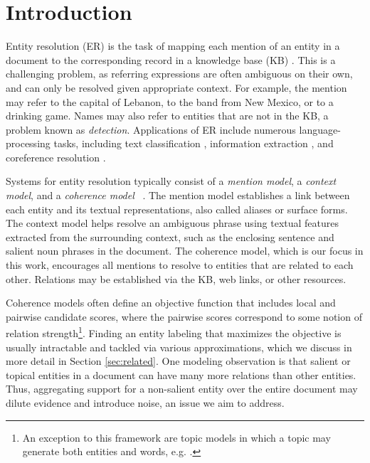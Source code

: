 \section{Introduction}
\label{sec:intro}

Entity resolution (ER) is the task of mapping each mention of an entity in a document to the corresponding record in a knowledge base (KB) \cite{BunescuP06,Cucerzan07,KulkarniSRC09,Dredze2010,Hoffart2011,Hachey2013130}.  
This is a challenging problem, as referring expressions are often ambiguous on their own, and can only be resolved given appropriate context. For example, the mention  may refer to the capital of Lebanon, to the band from New Mexico, or to a drinking game. Names may also refer to entities that are not in the KB, a problem known as \emph{{\NIL} detection}. 
Applications of ER include numerous language-processing tasks, including text classification \cite{Gabrilovich2007}, information extraction \cite{Lin2012}, and coreference resolution \cite{finin2009Coreference,mayfield2009cross}. 

Systems for entity resolution typically consist of a \emph{mention model}, a \emph{context model}, and a \emph{coherence model}~\cite{Milne2008,Cucerzan07,Ratinov11,Hoffart2011,Hachey2013130} .  The mention model establishes a link between each entity and its textual representations, also called aliases or surface forms. The context model helps resolve an ambiguous phrase using textual features extracted from the surrounding context, such as the enclosing sentence and salient noun phrases in the document. The coherence model, which is our focus in this work, encourages all mentions to resolve to entities that are related to each other. Relations may be established via the KB, web links, or other resources. 

Coherence models often define an objective function that includes local and pairwise candidate scores, where the pairwise scores correspond to some notion of relation strength\footnote{An exception to this framework are topic models in which a topic may generate both entities and words, e.g. \cite{kataria2011,HanS12,houlsby2014scalable}.}. Finding an entity labeling that maximizes the objective is usually intractable and tackled via various approximations, which we discuss in more detail in Section \ref{sec:related}. One modeling observation is that salient or topical entities in a document can have many more relations than other entities. Thus, aggregating support for a non-salient entity over the entire document may dilute evidence and introduce noise, an issue we aim to address.


